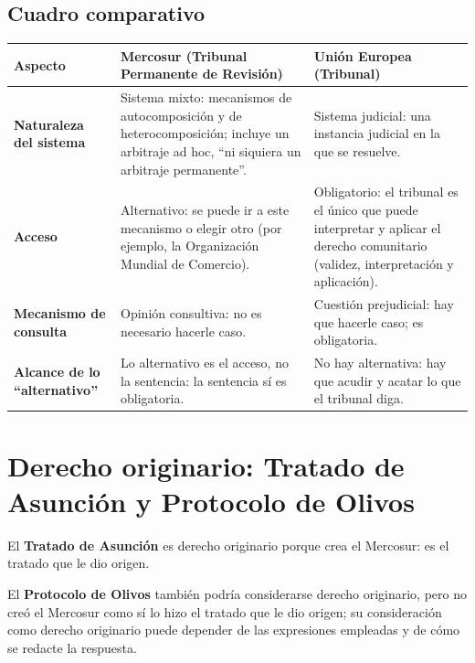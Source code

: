 \documentclass[12pt,oneside]{book}
\begin{document}
\subsection{Cuadro comparativo}

\begin{table}[H]
\centering
\small
\begin{tabularx}{\textwidth}{
    >{\raggedright\arraybackslash}p{}
    >{\raggedright\arraybackslash}X
    >{\raggedright\arraybackslash}X
}
\toprule
\textbf{Aspecto} &
\textbf{Mercosur (Tribunal Permanente de Revisión)} &
\textbf{Unión Europea (Tribunal)} \\
\midrule

\textbf{Naturaleza del sistema} &
Sistema mixto: mecanismos de autocomposición y de heterocomposición; incluye un arbitraje ad hoc, ``ni siquiera un arbitraje permanente''. &
Sistema judicial: una instancia judicial en la que se resuelve. \\

\textbf{Acceso} &
Alternativo: se puede ir a este mecanismo o elegir otro (por ejemplo, la Organización Mundial de Comercio). &
Obligatorio: el tribunal es el único que puede interpretar y aplicar el derecho comunitario (validez, interpretación y aplicación). \\

\textbf{Mecanismo de consulta} &
Opinión consultiva: no es necesario hacerle caso. &
Cuestión prejudicial: hay que hacerle caso; es obligatoria. \\

\textbf{Alcance de lo ``alternativo''} &
Lo alternativo es el acceso, no la sentencia: la sentencia sí es obligatoria. &
No hay alternativa: hay que acudir y acatar lo que el tribunal diga. \\

\bottomrule
\end{tabularx}
\end{table}

\section{Derecho originario: Tratado de Asunción y Protocolo de Olivos}

El \textbf{Tratado de Asunción} es derecho originario porque crea el Mercosur: es el tratado que le dio origen.

El \textbf{Protocolo de Olivos} también podría considerarse derecho originario, pero no creó el Mercosur como sí lo hizo el tratado que le dio origen; su consideración como derecho originario puede depender de las expresiones empleadas y de cómo se redacte la respuesta.
\end{document}
